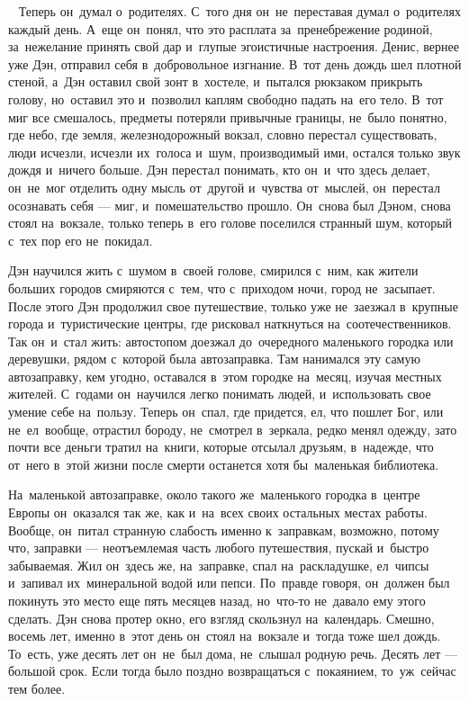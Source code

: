 ~
Теперь он~думал о~родителях.
С~того дня он~не~переставая думал о~родителях каждый день.
А~еще он~понял, что это расплата за~пренебрежение родиной, за~нежелание принять свой дар и~глупые эгоистичные настроения.
Денис, вернее уже Дэн, отправил себя в~добровольное изгнание.
В~тот день дождь шел плотной стеной, а~Дэн оставил свой зонт в~хостеле, и~пытался рюкзаком прикрыть голову, но~оставил это и~позволил каплям свободно падать на~его тело.
В~тот миг все смешалось, предметы потеряли привычные границы, не~было понятно, где небо, где земля, железнодорожный вокзал, словно перестал существовать, люди исчезли, исчезли их~голоса и~шум, производимый ими, остался только звук дождя и~ничего больше.
Дэн перестал понимать, кто он~и~что здесь делает, он~не~мог отделить одну мысль от~другой и~чувства от~мыслей, он~перестал осознавать себя --- миг, и~помешательство прошло.
Он~снова был Дэном, снова стоял на~вокзале, только теперь в~его голове поселился странный шум, который с~тех пор его не~покидал.
 
Дэн научился жить с~шумом в~своей голове, смирился с~ним, как жители больших городов смиряются с~тем, что с~приходом ночи, город не~засыпает.
После этого Дэн продолжил свое путешествие, только уже не~заезжал в~крупные города и~туристические центры, где рисковал наткнуться на~соотечественников.
Так он~и~стал жить: автостопом доезжал до~очередного маленького городка или деревушки, рядом с~которой была автозаправка.
Там нанимался эту самую автозаправку, кем угодно, оставался в~этом городке на~месяц, изучая местных жителей.
С~годами он~научился легко понимать людей, и~использовать свое умение себе на~пользу.
Теперь он~спал, где придется, ел, что пошлет Бог, или не~ел~вообще, отрастил бороду, не~смотрел в~зеркала, редко менял одежду, зато почти все деньги тратил на~книги, которые отсылал друзьям, в~надежде, что от~него в~этой жизни после смерти останется хотя бы~маленькая библиотека.
 
На~маленькой автозаправке, около такого же~маленького городка в~центре Европы он~оказался так же, как и~на~всех своих остальных местах работы.
Вообще, он~питал странную слабость именно к~заправкам, возможно, потому что, заправки --- неотъемлемая часть любого путешествия, пускай и~быстро забываемая.
Жил он~здесь же, на~заправке, спал на~раскладушке, ел~чипсы и~запивал их~минеральной водой или пепси.
По~правде говоря, он~должен был покинуть это место еще пять месяцев назад, но~что-то не~давало ему этого сделать.
Дэн снова протер окно, его взгляд скользнул на~календарь.
Смешно, восемь лет, именно в~этот день он~стоял на~вокзале и~тогда тоже шел дождь.
То~есть, уже десять лет он~не~был дома, не~слышал родную речь.
Десять лет --- большой срок.
Если тогда было поздно возвращаться с~покаянием, то~уж~сейчас тем более.


